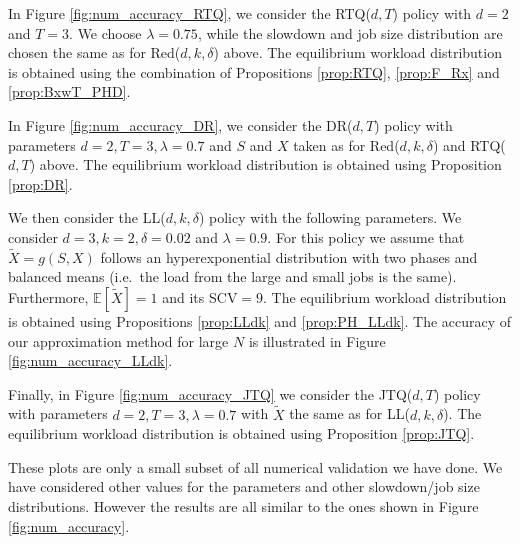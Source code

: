 \documentclass[12pt]{report}
\newcommand{\E}{\mathbb{E}}
\begin{document}
In Figure \ref{fig:num_accuracy_RTQ}, we consider the RTQ($d,T$) policy with $d=2$ and $T = 3$.
We choose $\lambda = 0.75$, while the slowdown and job size distribution are chosen the same as for Red($d,k,\delta$) above. The equilibrium workload distribution is obtained using the combination of Propositions \ref{prop:RTQ}, \ref{prop:F_Rx} and \ref{prop:BxwT_PHD}.

In Figure \ref{fig:num_accuracy_DR}, we consider the DR($d,T$) policy with parameters $d=2, T=3, \lambda = 0.7$ and  $S$ and $X$ taken as for Red($d,k,\delta$) and RTQ($d,T$) above. The equilibrium workload distribution is obtained using Proposition \ref{prop:DR}.

We then consider the LL($d,k,\delta$) policy with the following parameters. We consider $d = 3, k=2, \delta = 0.02$ and $\lambda = 0.9$. For this policy we assume that $\tilde X = g(S,X)$ follows an hyperexponential distribution with two phases and balanced means (i.e.~the load from the large and small jobs is the same). Furthermore,  $\E[\tilde X] = 1$ and its SCV$=9$. The equilibrium workload distribution is obtained using Propositions \ref{prop:LLdk} and \ref{prop:PH_LLdk}. The accuracy of our approximation method for large $N$ is illustrated in Figure \ref{fig:num_accuracy_LLdk}.

Finally, in Figure \ref{fig:num_accuracy_JTQ} we consider the JTQ($d,T$) policy with parameters $d=2,T=3,\lambda =0.7$ with  $\tilde X$ the same as for LL($d,k,\delta$). The equilibrium workload distribution is obtained using Proposition \ref{prop:JTQ}.

These plots are only a small subset of all numerical validation we have done. We have considered other values for the parameters and other slowdown/job size distributions. However the results are all similar to the ones shown in Figure \ref{fig:num_accuracy}.
\end{document}
